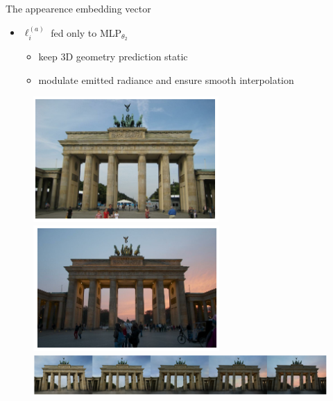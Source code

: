 \documentclass[aspectratio=1610,handout]{beamer}
\begin{document}
\begin{frame}{The appearence embedding vector}
    \begin{itemize}
        \item \(\ell_i^{(a)}\) fed only to MLP\(_{\theta_2}\) 
        \begin{itemize}
            \item keep 3D geometry prediction static
            \item modulate emitted radiance and ensure smooth interpolation
        \end{itemize} 
    \end{itemize}
    \bigskip
    \begin{figure}[H]
        \centering
        \includegraphics[width=.2\textwidth,keepaspectratio]{nerfa-results-1.png}
        \hspace{4cm}
        \includegraphics[width=.2\textwidth,keepaspectratio]{nerfa-results-3.png}\\
        \includegraphics[width=.9\textwidth,keepaspectratio]{nerfa-results-2.png}
    \end{figure}
\end{frame}
\end{document}
